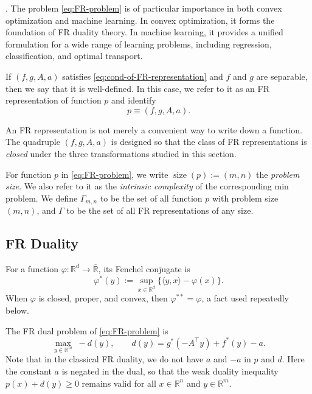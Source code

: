 .
The problem \eqref{eq:FR-problem} is of particular importance in both
convex optimization and machine learning. In convex optimization, it
forms the foundation of FR duality theory. In machine learning, it
provides a unified formulation for a wide range of learning problems,
including regression, classification, and optimal transport.


\begin{definition}[FR representation]
    If \((f,g,A,a)\) satisfies \eqref{eq:cond-of-FR-representation} and \(f\) and \(g\) are separable, then we say that it is well-defined. In this case, we refer to it as an FR representation of function \(p\) and identify
    \[
    p\equiv (f,g,A,a).
    \]
\end{definition}

An FR representation is not merely a convenient way to write down a function. The quadruple \((f,g,A,a)\) is designed so that the class of
FR representations is \emph{closed} under the three transformations
studied in this section. 

For function \(p\) in \eqref{eq:FR-problem}, we write \(\operatorname{size}(p):=(m,n)\) the \emph{problem size}. We also refer to it as the \emph{intrinsic complexity} of the corresponding min problem. 
We define $\Gamma_{m, n}$ to be the set of all function $p$ with problem size $(m, n)$, and $\Gamma$ to be the set of all FR representations of any size.






\subsection{FR Duality}


For a function \(\varphi:\mathbb R^d\to\overline{\mathbb R}\), its Fenchel
conjugate is
\[
\varphi^*(y):=\sup_{x\in\mathbb R^d}\{\langle y,x\rangle-\varphi(x)\}.
\]
When \(\varphi\) is closed, proper, and convex, then
\(\varphi^{**}=\varphi\), a fact used repeatedly below. 

The FR dual problem of \eqref{eq:FR-problem} is
\[
\max_{y \in \mathbb R^m}\;
-d(y), \qquad d(y) = g^*(-A^\top y) + f^*(y)-a.
\]
Note that in the classical FR duality, we do not have \(a\) and \(-a\) in \(p\) and \(d\). 
Here the constant \(a\) is negated in the dual, so that the weak duality inequality \(p(x) + d(y)\geq 0\) remains valid for all \(x\in \mathbb R^n\) and \(y \in \mathbb R^m\).

